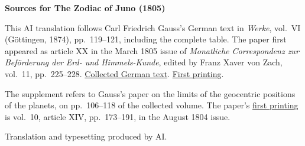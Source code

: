 \clearpage\thispagestyle{empty}
\begin{center}\textbf{Sources for The Zodiac of Juno (1805)}\end{center}
\noindent This AI translation follows Carl Friedrich Gauss’s German text in \textit{Werke}, vol.~VI (Göttingen, 1874), pp.~119--121, including the complete table. The paper first appeared as article XX in the March 1805 issue of \textit{Monatliche Correspondenz zur Beförderung der Erd- und Himmels-Kunde}, edited by Franz Xaver von Zach, vol.~11, pp.~225--228. \href{https://gdz.sub.uni-goettingen.de/id/PPN236007467}{Collected German text}. \href{https://www.digitale-sammlungen.de/en/view/bsb10538603?page=237}{First printing}.
\par\smallskip\noindent The supplement refers to Gauss’s paper on the limits of the geocentric positions of the planets, on pp.~106--118 of the collected volume. The paper’s \href{https://www.digitale-sammlungen.de/en/view/bsb10538602?page=181}{first printing} is vol.~10, article XIV, pp.~173--191, in the August 1804 issue.
\par\smallskip\noindent Translation and typesetting produced by AI.
\clearpage
